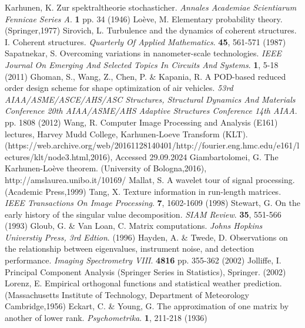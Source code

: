 \documentclass[sn-mathphys-num]{sn-jnl}%
\begin{document}
\begin{thebibliography}{000}
Karhunen, K. Zur spektraltheorie stochasticher. {\em Annales Academiae Scientiarum Fennicae Series A}. \textbf{1} pp. 34 (1946)
Loève, M. Elementary probability theory. (Springer,1977)
Sirovich, L. Turbulence and the dynamics of coherent structures. I. Coherent structures. {\em Quarterly Of Applied Mathematics}. \textbf{45}, 561-571 (1987)
Sapatnekar, S. Overcoming variations in nanometer-scale technologies. {\em IEEE Journal On Emerging And Selected Topics In Circuits And Systems}. \textbf{1}, 5-18 (2011)
Ghoman, S., Wang, Z., Chen, P. \& Kapania, R. A POD-based reduced order design scheme for shape optimization of air vehicles. {\em 53rd AIAA/ASME/ASCE/AHS/ASC Structures, Structural Dynamics And Materials Conference 20th AIAA/ASME/AHS Adaptive Structures Conference 14th AIAA}. pp. 1808 (2012)
Wang, R. Computer Image Processing and Analysis (E161) lectures, Harvey Mudd College, Karhunen-Loeve Transform (KLT). (https://web.archive.org/web/20161128140401/http://fourier.eng.hmc.edu/e161/lectures/klt/node3.html,2016), Accessed 29.09.2024
Giambartolomei, G. The Karhunen-Loève theorem. (University of Bologna,2016), http://amslaurea.unibo.it/10169/
Mallat, S. A wavelet tour of signal processing. (Academic Press,1999)
Tang, X. Texture information in run-length matrices. {\em IEEE Transactions On Image Processing}. \textbf{7}, 1602-1609 (1998)
Stewart, G. On the early history of the singular value decomposition. {\em SIAM Review}. \textbf{35}, 551-566 (1993)
Gloub, G. \& Van Loan, C. Matrix computations. {\em Johns Hopkins Universtiy Press, 3rd Edtion}. (1996)
Hayden, A. \& Twede, D. Observations on the relationship between eigenvalues, instrument noise, and detection performance. {\em Imaging Spectrometry VIII}. \textbf{4816} pp. 355-362 (2002)
Jolliffe, I. Principal Component Analysis (Springer Series in Statistics), Springer.  (2002)
Lorenz, E. Empirical orthogonal functions and statistical weather prediction. (Massachusetts Institute of Technology, Department of Meteorology Cambridge,1956)
Eckart, C. \& Young, G. The approximation of one matrix by another of lower rank. {\em Psychometrika}. \textbf{1}, 211-218 (1936)

\end{thebibliography}
\end{document}
